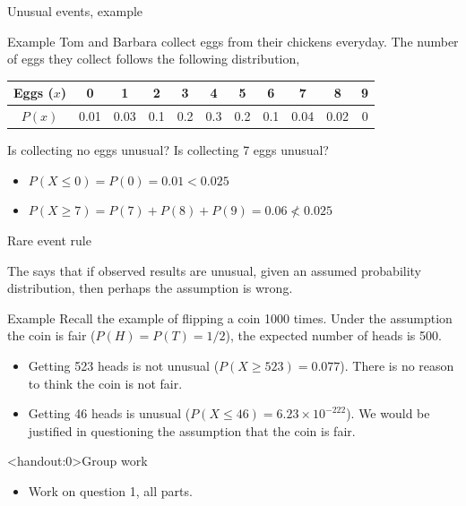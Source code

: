 \documentclass[xcolor=table]{beamer}
\begin{document}
\begin{frame}{Unusual events, example}
\begin{exampleblock}{Example}
Tom and Barbara collect eggs from their chickens everyday. The number of eggs they collect follows the following distribution,\\
\smallskip
{\centering
\begin{tabular}{c|cccccccccc}
Eggs ($x$) & 0 & 1 & 2 & 3 & 4 & 5 & 6 & 7 & 8 & 9 \\
\hline
$P(x)$ & 0.01 & 0.03 & 0.1 & 0.2 & 0.3 & 0.2 & 0.1 & 0.04 & 0.02 & 0
\end{tabular}\par
}
\medskip
Is collecting no eggs unusual? Is collecting 7 eggs unusual?
\begin{itemize}
\pause\item $P(X\le 0) = P(0)  = 0.01  < 0.025$
\pause\item $P(X \ge 7) = P(7) + P(8) + P(9) = 0.06 \not < 0.025$
\end{itemize}
\end{exampleblock}
\end{frame}

\begin{frame}{Rare event rule}
\begin{block}{}
The  says that if observed results are unusual, given an assumed probability distribution, then perhaps the assumption is wrong.
\end{block}
\pause
\begin{exampleblock}{Example}
Recall the example of flipping a coin 1000 times. Under the assumption the coin is fair ($P(H) = P(T) = 1/2$), the expected number of heads is 500.
\begin{itemize}
\pause\item Getting 523 heads is not unusual ($P(X \ge 523) = 0.077$). There is no reason to think the coin is not fair.
\pause\item Getting 46 heads is unusual ($P(X \le 46) = 6.23 \times 10^{-222}$). We would be justified in questioning the assumption that the coin is fair.
\end{itemize}
\end{exampleblock}
\end{frame}

\begin{frame}<handout:0>{Group work}
\begin{block}{}
\large
\begin{itemize}
\item Work on question 1, all parts.
\end{itemize}
\end{block}
\end{frame}
\end{document}
